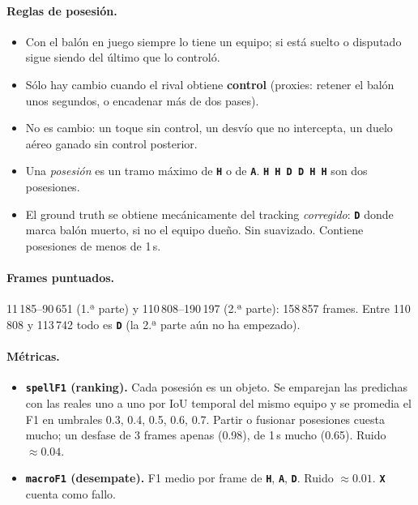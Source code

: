 \documentclass[11pt,a4paper]{article}
\newcommand{\lab}[1]{\texttt{\textbf{#1}}}
\begin{document}
\paragraph{Reglas de posesi\'on.}
\begin{itemize}
  \item Con el bal\'on en juego siempre lo tiene un equipo; si est\'a suelto o disputado sigue
        siendo del \'ultimo que lo control\'o.
  \item S\'olo hay cambio cuando el rival obtiene \textbf{control} (proxies: retener el bal\'on
        unos segundos, o encadenar m\'as de dos pases).
  \item No es cambio: un toque sin control, un desv\'io que no intercepta, un duelo a\'ereo
        ganado sin control posterior.
  \item Una \emph{posesi\'on} es un tramo m\'aximo de \lab{H} o de \lab{A}.
        \lab{H H D D H H} son dos posesiones.
  \item El ground truth se obtiene mec\'anicamente del tracking \emph{corregido}: \lab{D} donde
        marca bal\'on muerto, si no el equipo due\~no. Sin suavizado. Contiene posesiones de
        menos de 1\,s.
\end{itemize}

\paragraph{Frames puntuados.} 11\,185--90\,651 (1.ª parte) y 110\,808--190\,197 (2.ª parte):
158\,857 frames. Entre 110\,808 y 113\,742 todo es \lab{D} (la 2.ª parte a\'un no ha empezado).

\paragraph{M\'etricas.}
\begin{itemize}
  \item \textbf{\texttt{spellF1} (ranking).} Cada posesi\'on es un objeto. Se emparejan las
        predichas con las reales uno a uno por IoU temporal del mismo equipo y se promedia el F1
        en umbrales 0.3, 0.4, 0.5, 0.6, 0.7. Partir o fusionar posesiones cuesta mucho; un
        desfase de 3 frames apenas (0.98), de 1\,s mucho (0.65). Ruido $\approx 0.04$.
  \item \textbf{\texttt{macroF1} (desempate).} F1 medio por frame de \lab{H}, \lab{A}, \lab{D}.
        Ruido $\approx 0.01$. \lab{X} cuenta como fallo.
\end{itemize}
\end{document}
